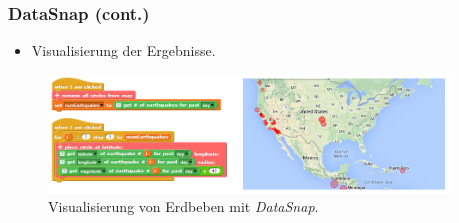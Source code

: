 \begin{frame}
  \frametitle{DataSnap (cont.)}

  \begin{itemize}
    \item Visualisierung der Ergebnisse.
  \end{itemize}
  \begin{figure}
    \begin{center}
      \includegraphics[width=0.95\textwidth]{assets/datasnap-visualization.png}
    \end{center}
    \caption{Visualisierung von Erdbeben mit \textit{DataSnap}. \parencite[28]{hellmannDataSnapEnabling2015}}
  \end{figure}


\end{frame}

